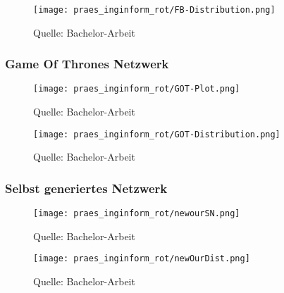 \documentclass[notes=show]{beamer}
\begin{document}
\begin{frame}
\vspace{-2.6cm}
\vspace{2.5cm}
  \begin{figure}
  \hspace{4cm}
  \texttt{[image: praes\_inginform\_rot/FB-Distribution.png]}
  \caption{Quelle: Bachelor-Arbeit}
  \label{fig:distributionALL}
\end{figure}
\end{frame}

\begin{frame}
  \frametitle{Game Of Thrones Netzwerk}
\vspace{-2.6cm}
\vspace{2.5cm}
  \begin{figure}
  \hspace{4cm}
  \texttt{[image: praes\_inginform\_rot/GOT-Plot.png]}
  \caption{Quelle: Bachelor-Arbeit}
  \label{fig:distributionALL}
\end{figure}
\end{frame}

\begin{frame}
\vspace{-2.6cm}
\vspace{2.5cm}
  \begin{figure}
  \hspace{4cm}
  \texttt{[image: praes\_inginform\_rot/GOT-Distribution.png]}
  \caption{Quelle: Bachelor-Arbeit}
  \label{fig:distributionALL}
\end{figure}
\end{frame}

\begin{frame}
  \frametitle{Selbst generiertes Netzwerk}
\vspace{-2.6cm}
\vspace{2.5cm}
  \begin{figure}
  \hspace{4cm}
  \texttt{[image: praes\_inginform\_rot/newourSN.png]}
  \caption{Quelle: Bachelor-Arbeit}
  \label{fig:distributionALL}
\end{figure}
\end{frame}

\begin{frame}
\vspace{-2.6cm}
\vspace{2.5cm}
  \begin{figure}
  \hspace{4cm}
  \texttt{[image: praes\_inginform\_rot/newOurDist.png]}
  \caption{Quelle: Bachelor-Arbeit}
  \label{fig:distributionALL}
\end{figure}
\end{frame}
\end{document}
